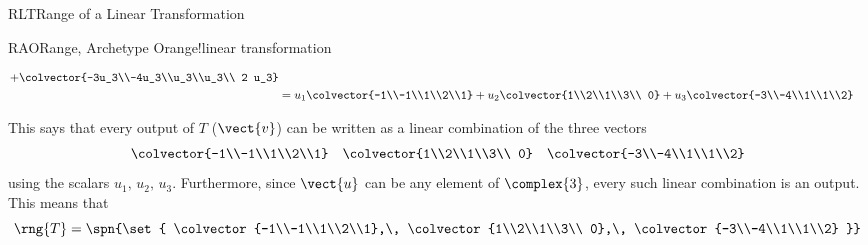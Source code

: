 \begin{subsect}{RLT}{Range of a Linear Transformation}
\begin{example}{RAO}{Range, Archetype O}{range!linear transformation}
\begin{para}
\begin{align*}
+
\colvector{-3u_3\\-4u_3\\u_3\\u_3\\ 2 u_3}\\
&=
u_1\colvector{-1\\-1\\1\\2\\1}
+
u_2\colvector{1\\2\\1\\3\\ 0}
+
u_3\colvector{-3\\-4\\1\\1\\2}
%
\end{align*}
\end{para}
%
\begin{para}This says that every output of $T$ ($\vect{v}$) can be written as a linear combination of the three vectors
%
\begin{align*}
\colvector{-1\\-1\\1\\2\\1}
&&
\colvector{1\\2\\1\\3\\ 0}
&&
\colvector{-3\\-4\\1\\1\\2}
\end{align*}
%
using the scalars $u_1,\,u_2,\,u_3$.  Furthermore, since $\vect{u}$ can be any element of $\complex{3}$, every such linear combination is an output.  This means that
%
\begin{equation*}
\rng{T}=\spn{\set{
\colvector{-1\\-1\\1\\2\\1},\,
\colvector{1\\2\\1\\3\\ 0},\,
\colvector{-3\\-4\\1\\1\\2}
}}
\end{equation*}

\end{para}
\end{example}
\end{subsect}
